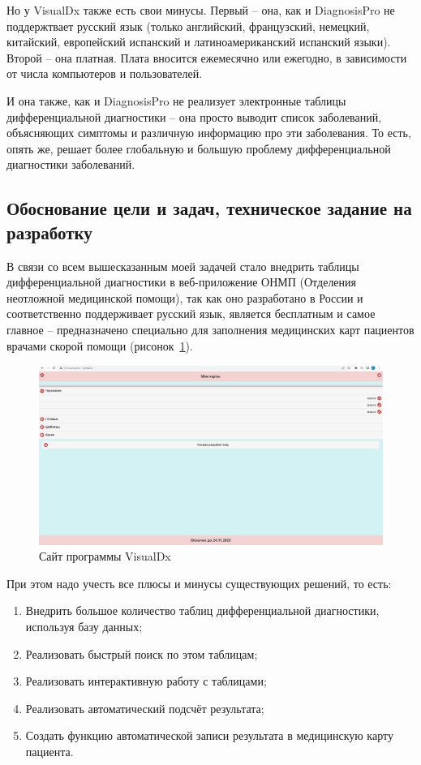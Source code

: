 Но у VisualDx также есть свои минусы. Первый -- она, как и  DiagnosisPro не поддержтвает русский язык (только английский, французский, немецкий, китайский, европейский испанский и латиноамериканский испанский языки). Второй -- она платная. Плата вносится ежемесячно или ежегодно, в зависимости от числа компьютеров и пользователей.

И она также, как и DiagnosisPro не реализует электронные таблицы дифференциальной диагностики -- она просто выводит список заболеваний, объясняющих симптомы и различную информацию про эти заболевания. То есть, опять же, решает более глобальную и большую проблему дифференциальной диагностики заболеваний.

\subsection{Обоснование цели и задач, техническое задание на разработку}

В связи со всем вышесказанным моей задачей стало внедрить таблицы дифференциальной диагностики в веб-приложение ОНМП (Отделения неотложной медицинской помощи), так как оно разработано в России и соответственно поддерживает русский язык, является бесплатным и самое главное -- предназначено специально для заполнения медицинских карт пациентов врачами скорой помощи (рисонок~\ref{fig:onmp0}). 

\begin{figure}
  \includegraphics[scale=0.3]{src/onmp0.png}
  \caption{Сайт программы VisualDx}
  \label{fig:onmp0}
\end{figure}

При этом надо учесть все плюсы и минусы существующих решений, то есть:

\begin{enumerate}
  \item Внедрить большое количество таблиц дифференциальной диагностики, используя базу данных;
  \item Реализовать быстрый поиск по этом таблицам;
  \item Реализовать интерактивную работу с таблицами;
  \item Реализовать автоматический подсчёт результата;
  \item Создать функцию автоматической записи результата в медицинскую карту пациента.
\end{enumerate}


